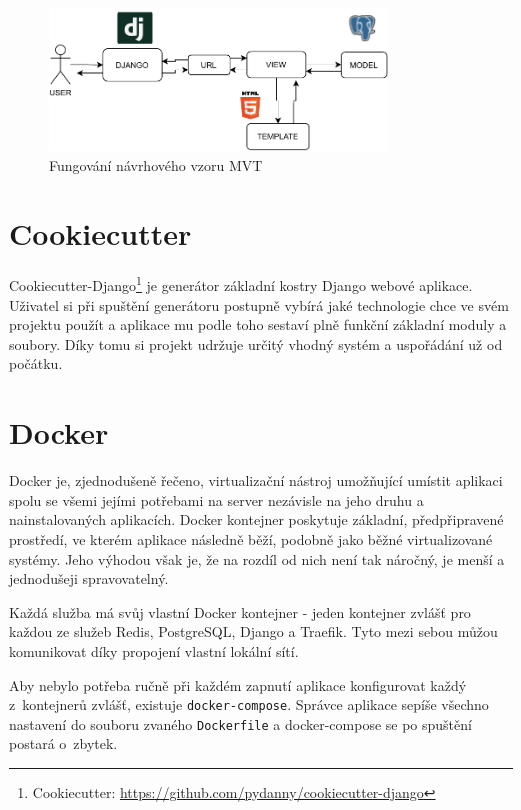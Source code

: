 \begin{figure}
    \centering
    \includegraphics[width=0.8\textwidth]{obrazky-figures/MVT.pdf}
    \caption{Fungování návrhového vzoru MVT}
    \label{fig:MVT}
\end{figure}

\section{Cookiecutter}
Cookiecutter-Django\footnote{Cookiecutter: \url{https://github.com/pydanny/cookiecutter-django}} je generátor základní kostry Django webové aplikace. Uživatel si při spuštění generátoru postupně vybírá jaké technologie chce ve svém projektu použít a aplikace mu podle toho sestaví plně funkční základní moduly a soubory. Díky tomu si projekt udržuje určitý vhodný systém a uspořádání už od počátku.

\section{Docker}
Docker je, zjednodušeně řečeno, virtualizační nástroj umožňující umístit aplikaci spolu se všemi jejími potřebami na server nezávisle na jeho druhu a nainstalovaných aplikacích. Docker kontejner poskytuje základní, předpřipravené prostředí, ve kterém aplikace následně běží, podobně jako běžné virtualizované systémy. Jeho výhodou však je, že na rozdíl od nich není tak náročný, je menší a jednodušeji spravovatelný.  

\par Každá služba má svůj vlastní Docker kontejner - jeden kontejner zvlášť pro každou ze služeb Redis, PostgreSQL, Django a Traefik. Tyto mezi sebou můžou komunikovat díky propojení vlastní lokální sítí. 

\par 
Aby nebylo potřeba ručně při každém zapnutí aplikace konfigurovat každý z~kontejnerů zvlášť, existuje \texttt{docker-compose}. Správce aplikace sepíše všechno nastavení do souboru zvaného \texttt{Dockerfile} a docker-compose se po spuštění postará o~zbytek.

